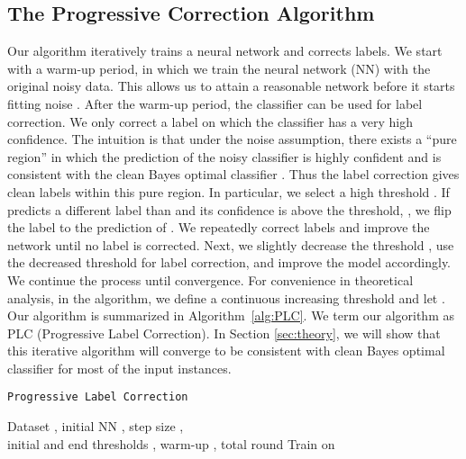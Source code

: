 \documentclass{article} \usepackage{iclr2021_conference,times}
\begin{document}
\subsection{The Progressive Correction Algorithm}
\label{sec:alg}
Our algorithm iteratively trains a neural network and corrects labels. 
We start with a warm-up period, in which we train the neural network (NN) with the original noisy data. This allows us to attain a reasonable network before it starts fitting noise \citep{Zhang_noise_ICLR2017}.
After the warm-up period, the classifier can be used for label correction. 
We only correct a label on which the classifier  has a very high confidence. 
The intuition is that under the noise assumption, there exists a ``pure region'' in which the prediction of the noisy classifier  is highly confident and is consistent with the clean Bayes optimal classifier .
Thus the label correction gives clean labels within this pure region.
In particular, we select a high threshold . If  predicts a different label than  and its confidence is above the threshold, , we flip the label  to the prediction of .
We repeatedly correct labels and improve the network until no label is corrected.
Next, we slightly decrease the threshold , use the decreased threshold for label correction, and improve the model accordingly. We continue the process until convergence.
For convenience in theoretical analysis, in the algorithm, we define a continuous increasing threshold  and let .
Our algorithm is summarized in Algorithm~\ref{alg:PLC}. We term our algorithm as PLC (Progressive Label Correction).
In Section \ref{sec:theory}, we will show that this iterative algorithm will converge to be consistent with clean Bayes optimal classifier  for most of the input instances.

\begin{table}[h]
\centering
\begin{minipage}[t]{1\textwidth}
\begin{algorithm}[H] 
\caption{\texttt{Progressive Label Correction}}
\label{alg:PLC}
\begin{algorithmic}[1]
\REQUIRE Dataset , initial NN , step size ,\\
initial and end thresholds , warm-up , total round 
\ENSURE 
\STATE 
\STATE 
\FOR {}
    \STATE Train  on 
\FORALL{ \AND }
    \STATE   {}    
    \ENDFOR
    \IF {}
    \STATE 
\IF {}
    \STATE {}
    \ENDIF
    \ENDIF
    \STATE {}
\ENDFOR
\end{algorithmic}
\end{algorithm}
\end{minipage}
\end{table}
\end{document}
